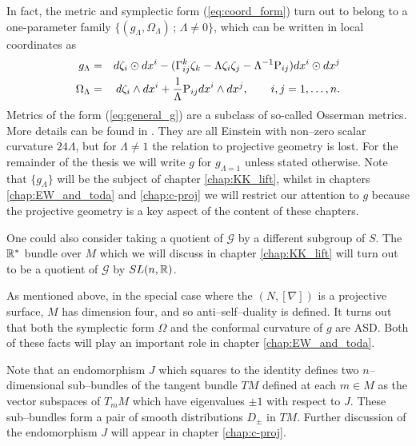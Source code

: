 \begin{rmk}
In fact, the metric and symplectic form (\ref{eq:coord_form}) turn
out to belong to a one-parameter family $\{(g_\Lambda,\Omega_\Lambda)\,;\,\Lambda\neq 0\}$, which
can be written in local coordinates as 
\begin{eqnarray}
g_{\Lambda} & = &  d\zeta_{i}\odot dx^{i}-(\Gamma_{ij}^{k}\zeta_{k}-\Lambda \zeta_{i}\zeta_{j}-\Lambda^{-1}\mathrm{P}_{ij}) dx^{i}\odot dx^{j}\label{eq:general_g}\\
\Omega_{\Lambda} & = &  d\zeta_{i}\wedge dx^{i}+\frac{1}{\Lambda}\mathrm{P}_{ij} dx^{i}\wedge dx^{j},\qquad i,j=1,\dots ,n.\label{eq:general_omega}
\end{eqnarray}
Metrics of the form (\ref{eq:general_g}) are a subclass of so-called
Osserman metrics. More details can be found in \cite{osserman}. They are all Einstein with non--zero scalar curvature $24\Lambda$, but for $\Lambda\neq1$ the relation to projective geometry is lost. For the remainder of the thesis we will write $g$ for $g_{\Lambda=1}$ unless stated otherwise. Note that $\{g_\Lambda\}$ will be the subject of chapter \ref{chap:KK_lift}, whilst in chapters  \ref{chap:EW_and_toda} and \ref{chap:c-proj} we will restrict our attention to $g$ because the projective geometry is a key aspect of the content of these chapters.
\end{rmk}



\begin{rmk}
One could also consider taking a quotient of $\mathcal{G}$ by a different subgroup of $S$. The $\mathbb{R}^*$ bundle over $M$ which we will discuss in chapter \ref{chap:KK_lift} will turn out to be a quotient of $\mathcal{G}$ by $SL(n,\mathbb{R})$.
\end{rmk}

\begin{rmk}
As mentioned above, in the special case where the $(N,[\nabla])$ is a projective surface, $M$ has dimension four, and so anti--self--duality is defined. It turns out that both the symplectic form $\Omega$ and the conformal curvature of $g$ are ASD. Both of these facts will play an important role in chapter \ref{chap:EW_and_toda}.
\end{rmk}

\begin{rmk}
Note that an endomorphism $J$ which squares to the identity defines two $n$--dimensional sub--bundles of the tangent bundle $TM$ defined at each $m\in M$ as the vector subspaces of $T_mM$ which have eigenvalues $\pm 1$ with respect to $J$. These sub--bundles form a pair of smooth distributions $D_\pm$ in $TM$. Further discussion of the endomorphism $J$ will appear in chapter \ref{chap:c-proj}.
\end{rmk}

